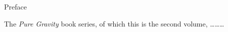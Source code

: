\newpage           %
\thispagestyle{empty}      %
\mbox{}                    %
\newpage                   %



\begin{center}
{\lgb Preface}
\end{center}

The {\it Pure Gravity} book series, of which this is the second volume,
\dots\dots\dots


\tableofcontents

\listoffigures

